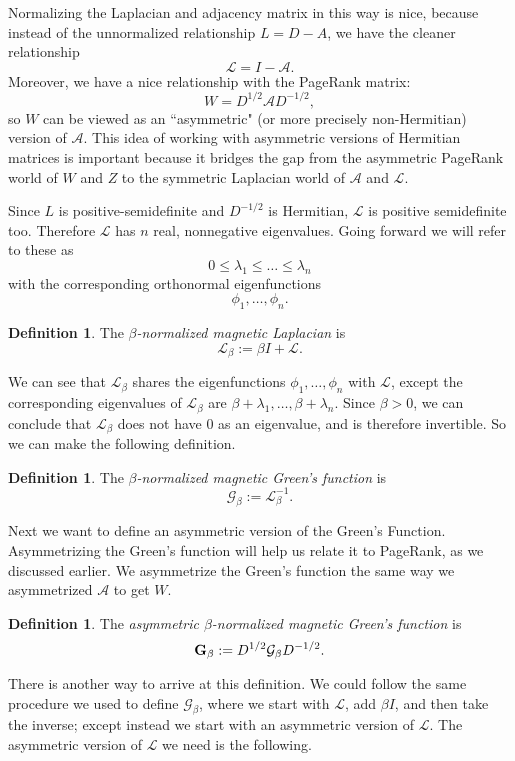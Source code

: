 \documentclass{article}
\theoremstyle{definition}
\newtheorem{defn}[thm]{Definition}
\newcommand{\lap}{\mathcal{L}}
\newcommand{\normadj}{\mathcal{A}}
\newcommand{\green}{\mathcal{G}}
\newcommand{\asymgreen}{\normalfont{\textbf{G}}}
\begin{document}
Normalizing the Laplacian and adjacency matrix in this way is nice, because instead of the unnormalized relationship $L = D - A$, we have the cleaner relationship $$\lap = I - \normadj.$$ Moreover, we have a nice relationship with the PageRank matrix: $$W = D^{1/2} \normadj D^{-1/2},$$ so $W$ can be viewed as an ``asymmetric" (or more precisely non-Hermitian) version of $\normadj$. This idea of working with asymmetric versions of Hermitian matrices is important because it bridges the gap from the asymmetric PageRank world of $W$ and $Z$ to the symmetric Laplacian world of $\normadj$ and $\lap$.

Since $L$ is positive-semidefinite and $D^{-1/2}$ is Hermitian, $\lap$ is positive semidefinite too. Therefore $\lap$ has $n$ real, nonnegative eigenvalues. Going forward we will refer to these as $$0 \leq \lambda_1 \leq \dots \leq \lambda_n$$ with the corresponding orthonormal eigenfunctions $$\phi_1, \dots, \phi_n.$$

\begin{defn}
The \textit{$\beta$-normalized magnetic Laplacian} is $$\lap_\beta := \beta I + \lap.$$
\end{defn}

We can see that $\lap_\beta$ shares the eigenfunctions $\phi_1, \dots, \phi_n$ with $\lap$, except the corresponding eigenvalues of $\lap_\beta$ are $\beta + \lambda_1, \dots, \beta + \lambda_n$. Since $\beta > 0$, we can conclude that $\lap_\beta$ does not have 0 as an eigenvalue, and is therefore invertible. So we can make the following definition.

\begin{defn}
The \textit{$\beta$-normalized magnetic Green's function} is $$\green_\beta := \lap_\beta^{-1}.$$
\end{defn}

Next we want to define an asymmetric version of the Green's Function. Asymmetrizing the Green's function will help us relate it to PageRank, as we discussed earlier. We asymmetrize the Green's function the same way we asymmetrized $\normadj$ to get $W$.

\begin{defn}
The \textit{asymmetric $\beta$-normalized magnetic Green's function} is
$$
\asymgreen_\beta := D^{1/2} \green_\beta D^{-1/2}.
$$
\end{defn}

There is another way to arrive at this definition. We could follow the same procedure we used to define $\green_\beta$, where we start with $\lap$, add $\beta I$, and then take the inverse; except instead we start with an asymmetric version of $\lap$. The asymmetric version of $\lap$ we need is the following.
\end{document}
